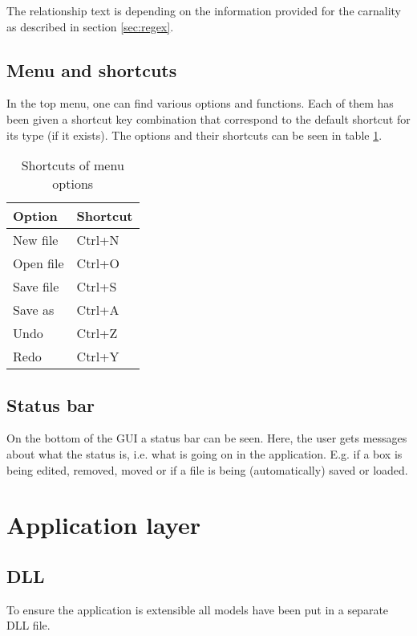 The relationship text is depending on the information provided for the carnality as described in section \ref{sec:regex}.

\subsection{Menu and shortcuts}

In the top menu, one can find various options and functions. Each of them has been given a shortcut key combination that correspond to the default shortcut for its type (if it exists). The options and their shortcuts can be seen in table \ref{tab:menu_shortcut}.

\begin{table}[htbp]
\centering
\begin{tabular}{|l|l|}
\hline
\textbf{Option} & \textbf{Shortcut}\\
\hline
New file & Ctrl+N\\
\hline
Open file & Ctrl+O\\
\hline
Save file & Ctrl+S\\
\hline
Save as & Ctrl+A\\
\hline
Undo & Ctrl+Z\\
\hline
Redo & Ctrl+Y\\
\hline
\end{tabular}
\caption{Shortcuts of menu options}
\label{tab:menu_shortcut}
\end{table}

\subsection{Status bar}

On the bottom of the GUI a status bar can be seen. Here, the user gets messages about what the status is, i.e. what is going on in the application. E.g. if a box is being edited, removed, moved or if a file is being (automatically) saved or loaded.

\section{Application layer}
\label{sec:app_layer}

\subsection{DLL}
To ensure the application is extensible all models have been put in a separate DLL file.

